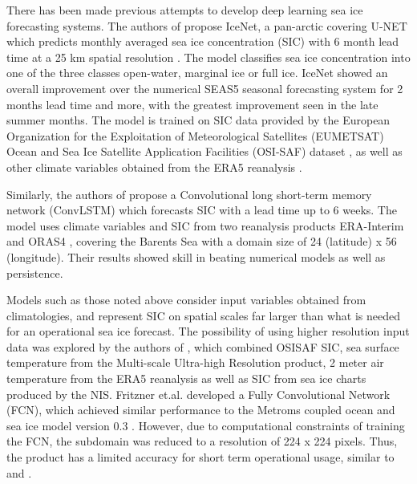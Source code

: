 \documentclass[../main/thesis.tex]{subfiles}
\begin{document}
There has been made previous attempts to develop deep learning sea ice forecasting systems. The authors of \cite{Andersson2021} propose IceNet, a pan-arctic covering U-NET which predicts monthly averaged sea ice concentration (SIC) with 6 month lead time at a 25 km spatial resolution \cite{Andersson2021}. The model classifies sea ice concentration into one of the three classes open-water, marginal ice or full ice. IceNet showed an overall improvement over the numerical SEAS5 seasonal forecasting system \cite{Johnson2019} for 2 months lead time and more, with the greatest improvement seen in the late summer months. The model is trained on SIC data provided by the European Organization for the Exploitation of Meteorological Satellites (EUMETSAT) Ocean and Sea Ice Satellite Application Facilities (OSI-SAF) dataset \cite{Lavergne2019}, as well as other climate variables obtained from the ERA5 reanalysis \cite{Hersbach2020}.

Similarly, the authors of \cite{Liu2021} propose a Convolutional long short-term memory network (ConvLSTM) which forecasts SIC with a lead time up to 6 weeks. The model uses climate variables and SIC from two reanalysis products ERA-Interim \cite{Dee2011} and ORAS4 \cite{Balmaseda2013}, covering the Barents Sea with a domain size of 24 (latitude) x 56 (longitude). Their results showed skill in beating numerical models as well as persistence. 

Models such as those noted above consider input variables obtained from climatologies, and represent SIC on spatial scales far larger than what is needed for an operational sea ice forecast. The possibility of using higher resolution input data was explored by the authors of \cite{Fritzner2020}, which combined OSISAF SIC, sea surface temperature from the Multi-scale Ultra-high Resolution product, 2 meter air temperature from the ERA5 reanalysis as well as SIC from sea ice charts produced by the NIS. Fritzner et.al. developed a Fully Convolutional Network (FCN), which achieved similar performance to the Metroms coupled ocean and sea ice model version 0.3 \cite{Kristensen2017}. However, due to computational constraints of training the FCN, the subdomain was reduced to a resolution of 224 x 224 pixels. Thus, the product has a limited accuracy for short term operational usage, similar to \cite{Andersson2021} and \cite{Liu2021}.
\end{document}
